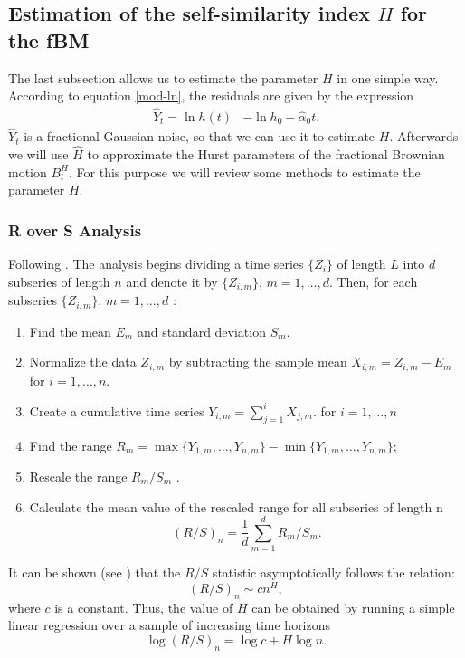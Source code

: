 \documentclass[smallextended]{svjour3}
\begin{document}
\subsection{Estimation of the self-similarity index $H$ for the fBM}
\label{Desc-Est-H}

The last subsection allows us to estimate the parameter $H$ in one simple way.
According to equation \eqref{mod-ln}, the residuals are given
by the expression
\begin{align*}
\hat Y_t= \ln h(t)&-\ln h_0 -\widehat \alpha_0t.
\end{align*}
$\hat Y_t$ is a fractional Gaussian noise, so that we can use it to estimate $
H$. Afterwards we will use  $\hat H$ to approximate
the Hurst parameters of the fractional Brownian motion $B_t^H$.
For this purpose we will review some methods to estimate
the parameter $H$.


\subsubsection{R over S Analysis}

Following \cite{we}. The analysis begins  dividing a time series $\{Z_i\}$ of
length $L$ into $d$
subseries of length $n$ and denote it by $\{Z_{i,m}\}$, $m = 1,\ldots,d$. Then,
for each subseries  $\{Z_{i,m}\}$, $m = 1,\ldots,d$ :
\begin{enumerate}
    \item Find the mean $E_m$ and standard deviation $S_m$.
    \item Normalize the data $Z_{i,m}$  by subtracting the sample mean $X_{i,m}
    =Z_{i,m}-E_m$ for $i=1,\ldots,n$.
    \item Create a cumulative time series $Y_{i,m} = \sum_{j=1}^i X_{j,m}$.
    for $i = 1,\ldots,n$
    \item Find the range $R_m = \max\{Y_{1,m},\ldots, Y_{n,m}\} -
    \min\{Y_{1,m},\ldots, Y_{n,m} \}$;
    \item Rescale the range $R_m/S_m$ .

    \item Calculate the mean value of the rescaled range
    for all subseries of length n
    \[
    (R/S)_n =\frac{1}{d}\sum_{m=1}^d  R_m /S_m.
    \]
\end{enumerate}

It can be shown (see \cite{we}) that the $R/S$ statistic asymptotically follows
the relation:
\[
(R/S)_n \sim c n^H,
\]
where $c$ is a constant. Thus, the value of $H$ can be obtained by running a
simple linear regression over a
sample of increasing time horizons
\[
\log(R/S)_n = \log c + H \log n.
\]
\end{document}

